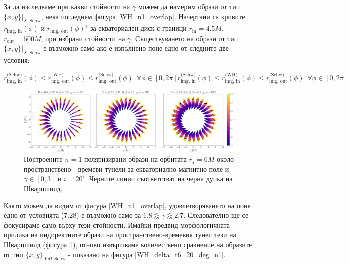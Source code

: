 За да изследваме при какви стойности на $\gamma$ можем да намерим образи от тип $\{x,y\}\vert_{X, \text{Schw}}$, нека погледнем фигура \ref{WH_n1_overlap}. Начертани са кривите $r_\text{img, in}(\phi)$ и $r_\text{img, out}(\phi)$$^1$ за екваториален диск с граници $r_\text{in} = 4.5M$, $r_\text{out} = 500M$, при избрани стойности на $\gamma$. Съществуването на образи от тип $\{x,y\}\vert_{X, \text{Schw}}$ е възможно само ако е изпълнено поне едно от следните две условия:


\begin{subequations}
	\begin{equation}
		r_\text{img, in}^{\text{(Schw)}}(\phi) \le r_\text{img, out}^{\text{(WH)}}(\phi) \le r_\text{img, out}^{\text{(Schw)}}(\phi)\,\,\, \forall\phi\in[0,2\pi]
	\end{equation}
	\begin{equation}
		r_\text{img, in}^{\text{(Schw)}}(\phi) \le r_\text{img, in}^{\text{(WH)}}(\phi) \le r_\text{img, out}^{\text{(Schw)}}(\phi)\,\,\, \forall\phi\in[0,2\pi]
	\end{equation}
\end{subequations}
\newpage
\begin{figure}[!htb]
	\hspace{-0.2cm}
	\includegraphics[scale = 0.17]{WH_alpha_Eq_Field_n1.png}
	\caption[Поляризирани $n=1$ образи около пространствено - времеви тунели за екваториално магнитно поле.]{\small Построените $n=1$ поляризирани образи на орбитата $r_s = 6M$ около пространствено - времеви тунели за екваториално магнитно поле и $\gamma \in[0,3]$ и $i = 20^\circ$. Черните линии съответстват на черна дупка на Шварцшилд.} 
	\label{WH_pol_eq_field_n1}
\end{figure}

\lfoot{}
Както можем да видим от фигура \ref{WH_n1_overlap}, удовлетворяването на поне едно от условията (7.28) е възможно само за  $1.8 \lessapprox \gamma \lessapprox 2.7$. Следователно ще се фокусираме само върху тези стойности. Имайки предвид морфологичната прилика на индиректните образи на пространствено-времевия тунел тези на Шварцшилд (фигура \ref{WH_pol_eq_field_n1}), отново извършваме количествено сравнение на образите от тип $\{x,y\}\vert_{6M, \text{Schw}}$ - показано на фигура \ref{WH_delta_r6_20_deg_n1}.\\

